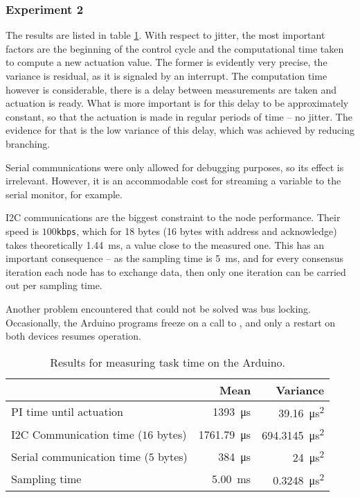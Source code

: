 \documentclass[english,fira]{ist-report}
\begin{document}
\subsubsection*{Experiment 2}

The results are listed in table \ref{tab:benchmarking}.
With respect to jitter, the most important factors are the beginning of the control cycle and the computational time taken to compute a new actuation value.
The former is evidently very precise, the variance is residual, as it is signaled by an interrupt.
The computation time however is considerable, there is a delay between measurements are taken and actuation is ready. 
What is more important is for this delay to be approximately constant, so that the actuation is made in regular periods of time -- no jitter.
The evidence for that is the low variance of this delay, which was achieved by reducing branching.

Serial communications were only allowed for debugging purposes, so its effect is irrelevant. 
However, it is an accommodable cost for streaming a variable to the serial monitor, for example.

I2C communications are the biggest constraint to the node performance. 
Their speed is $100$\texttt{kbps}, which for 18 bytes (16 bytes with address and acknowledge) takes theoretically \SI{1.44}{\milli\second}, a value close to the measured one.
This has an important consequence -- as the sampling time is \SI{5}{\milli\second}, and for every consensus iteration each node has to exchange data, then only one iteration can be carried out per sampling time.

Another problem encountered that could not be solved was bus locking. 
Occasionally, the Arduino programs freeze on a call to , and only a restart on both devices resumes operation.

\begin{table}[ht]
    \centering
    \begin{tabular}{l|rr}\toprule
                                      & Mean                        & Variance                          \tabularnewline
\midrule
PI time until actuation               & \SI{1393}{\micro\second}    & \SI{39.16}{\micro\second\squared}     \tabularnewline
I2C Communication time ($16$ bytes)   & \SI{1761.79}{\micro\second} & \SI{694.3145}{\micro\second\squared} \tabularnewline
Serial communication time ($5$ bytes) &  \SI{384}{\micro\second}    & \SI{24}{\micro\second\squared}        \tabularnewline
Sampling time                         &  \SI{5.00}{\milli\second}   & \SI{0.3248}{\micro\second\squared}    \tabularnewline
\bottomrule
    \end{tabular}
    \caption{Results for measuring task time on the Arduino.}
    \label{tab:benchmarking}
\end{table}
\end{document}
